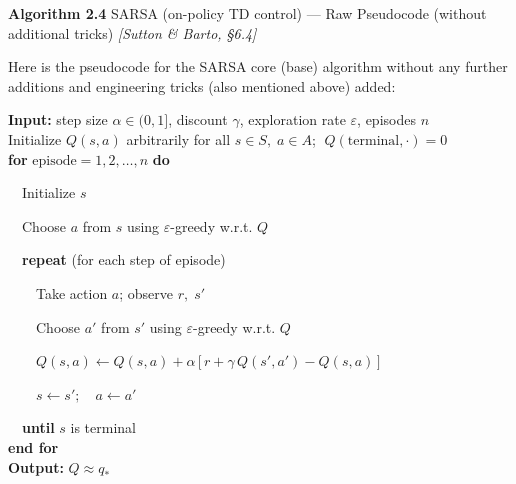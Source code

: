 \documentclass[11pt]{article}
\begin{document}
    \label{pseudo-2-4}

    \begin{pseudobox}

\textbf{Algorithm 2.4} SARSA (on-policy TD control) --- Raw Pseudocode
(without additional tricks) \emph{{[}Sutton \& Barto, §6.4{]}}

\tcbline

Here is the pseudocode for the SARSA core (base) algorithm without any
further additions and engineering tricks (also mentioned above) added:

\textbf{Input:} step size \(\alpha \in (0, 1]\), discount \(\gamma\),
exploration rate \(\varepsilon\), episodes \(n\)\\
Initialize \(Q(s, a)\) arbitrarily for all \(s \in S,\; a \in A\);
\(\;Q(\text{terminal}, \cdot) = 0\)\\
\textbf{for} \(\text{episode} = 1, 2, \ldots, n\) \textbf{do}\\
\strut ~~Initialize \(s\)\\
\strut ~~Choose \(a\) from \(s\) using \(\varepsilon\)-greedy w.r.t.
\(Q\)\\
\strut ~~\textbf{repeat} (for each step of episode)\\
\strut ~~~~Take action \(a\); observe \(r,\; s'\)\\
\strut ~~~~Choose \(a'\) from \(s'\) using \(\varepsilon\)-greedy w.r.t.
\(Q\)\\
\strut ~~~~\(Q(s, a) \leftarrow Q(s, a) + \alpha\,\bigl[\, r + \gamma\, Q(s', a') - Q(s, a) \,\bigr]\)\\
\strut ~~~~\(s \leftarrow s';\quad a \leftarrow a'\)\\
\strut ~~\textbf{until} \(s\) is terminal\\
\textbf{end for}\\
\textbf{Output:} \(Q \approx q_{*}\)

\end{pseudobox}
\end{document}
